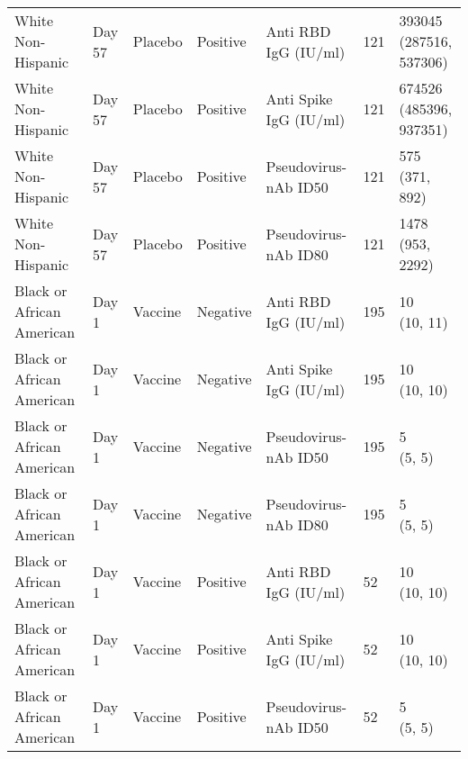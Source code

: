 \documentclass[]{book}
\theoremstyle{definition}
\theoremstyle{definition}
\theoremstyle{definition}
\newcommand{\1}{\mathbbm{1}}
\begin{document}
\begin{landscape}
\begin{ThreePartTable}
\begin{longtable}[t]{>{\raggedright\arraybackslash}p{7cm}llllll}
\hspace{1em}White Non-Hispanic & Day 57 & Placebo & Positive & Anti RBD IgG (IU/ml) & 121 & \makecell[l]{393045\\(287516, 537306)}\\
\hspace{1em}White Non-Hispanic & Day 57 & Placebo & Positive & Anti Spike IgG (IU/ml) & 121 & \makecell[l]{674526\\(485396, 937351)}\\
\hspace{1em}White Non-Hispanic & Day 57 & Placebo & Positive & Pseudovirus-nAb ID50 & 121 & \makecell[l]{575\\(371, 892)}\\
\hspace{1em}White Non-Hispanic & Day 57 & Placebo & Positive & Pseudovirus-nAb ID80 & 121 & \makecell[l]{1478\\(953, 2292)}\\
\hspace{1em}Black or African American & Day 1 & Vaccine & Negative & Anti RBD IgG (IU/ml) & 195 & \makecell[l]{10\\(10, 11)}\\
\hspace{1em}Black or African American & Day 1 & Vaccine & Negative & Anti Spike IgG (IU/ml) & 195 & \makecell[l]{10\\(10, 10)}\\
\hspace{1em}Black or African American & Day 1 & Vaccine & Negative & Pseudovirus-nAb ID50 & 195 & \makecell[l]{5\\(5, 5)}\\
\hspace{1em}Black or African American & Day 1 & Vaccine & Negative & Pseudovirus-nAb ID80 & 195 & \makecell[l]{5\\(5, 5)}\\
\hspace{1em}Black or African American & Day 1 & Vaccine & Positive & Anti RBD IgG (IU/ml) & 52 & \makecell[l]{10\\(10, 10)}\\
\hspace{1em}Black or African American & Day 1 & Vaccine & Positive & Anti Spike IgG (IU/ml) & 52 & \makecell[l]{10\\(10, 10)}\\
\hspace{1em}Black or African American & Day 1 & Vaccine & Positive & Pseudovirus-nAb ID50 & 52 & \makecell[l]{5\\(5, 5)}\\

\end{longtable}
\end{ThreePartTable}
\end{landscape}
\end{document}
